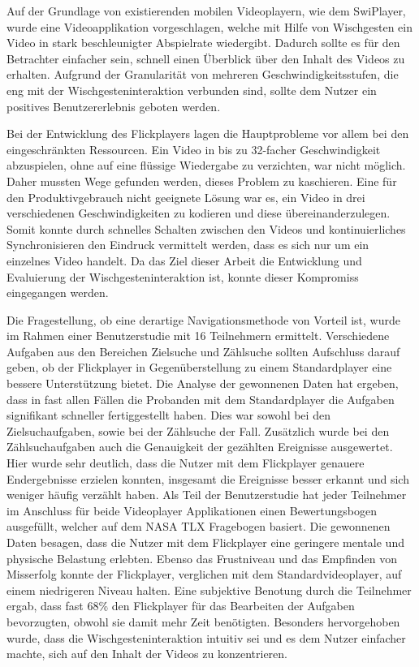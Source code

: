 \documentclass[11pt,a4paper]{report}
\begin{document}
Auf der Grundlage von existierenden mobilen Videoplayern, wie dem SwiPlayer, wurde eine Videoapplikation vorgeschlagen, welche mit Hilfe von Wischgesten ein Video in stark beschleunigter Abspielrate wiedergibt. Dadurch sollte es für den Betrachter einfacher sein, schnell einen Überblick über den Inhalt des Videos zu erhalten. Aufgrund der Granularität von mehreren Geschwindigkeitsstufen, die eng mit der Wischgesteninteraktion verbunden sind, sollte dem Nutzer ein positives Benutzererlebnis geboten werden. 

Bei der Entwicklung des Flickplayers lagen die Hauptprobleme vor allem bei den eingeschränkten Ressourcen. Ein Video in bis zu 32-facher Geschwindigkeit abzuspielen, ohne auf eine flüssige Wiedergabe zu verzichten, war nicht möglich. Daher mussten Wege gefunden werden, dieses Problem zu kaschieren. Eine für den Produktivgebrauch nicht geeignete Lösung war es, ein Video in drei verschiedenen Geschwindigkeiten zu kodieren und diese übereinanderzulegen. Somit konnte durch schnelles Schalten zwischen den Videos und kontinuierliches Synchronisieren den Eindruck vermittelt werden, dass es sich nur um ein einzelnes Video handelt. Da das Ziel dieser Arbeit die Entwicklung und Evaluierung der Wischgesteninteraktion ist, konnte dieser Kompromiss eingegangen werden.

Die Fragestellung, ob eine derartige Navigationsmethode von Vorteil ist, wurde im Rahmen einer Benutzerstudie mit 16 Teilnehmern ermittelt. Verschiedene Aufgaben aus den Bereichen Zielsuche und Zählsuche sollten Aufschluss darauf geben, ob der Flickplayer in Gegenüberstellung zu einem Standardplayer eine bessere Unterstützung bietet. Die Analyse der gewonnenen Daten hat ergeben, dass in fast allen Fällen die Probanden mit dem Standardplayer die Aufgaben signifikant schneller fertiggestellt haben. Dies war sowohl bei den Zielsuchaufgaben, sowie bei der Zählsuche der Fall. Zusätzlich wurde bei den Zählsuchaufgaben auch die Genauigkeit der gezählten Ereignisse ausgewertet. Hier wurde sehr deutlich, dass die Nutzer mit dem Flickplayer genauere Endergebnisse erzielen konnten, insgesamt die Ereignisse besser erkannt und sich weniger häufig verzählt haben. Als Teil der Benutzerstudie hat jeder Teilnehmer im Anschluss für beide Videoplayer Applikationen einen Bewertungsbogen ausgefüllt, welcher auf dem NASA TLX Fragebogen basiert. Die gewonnenen Daten besagen, dass die Nutzer mit dem Flickplayer eine geringere mentale und physische Belastung erlebten. Ebenso das Frustniveau und das Empfinden von Misserfolg konnte der Flickplayer, verglichen mit dem Standardvideoplayer, auf einem niedrigeren Niveau halten. Eine subjektive Benotung durch die Teilnehmer ergab, dass fast 68\% den Flickplayer für das Bearbeiten der Aufgaben bevorzugten, obwohl sie damit mehr Zeit benötigten. Besonders hervorgehoben wurde, dass die Wischgesteninteraktion intuitiv sei und es dem Nutzer einfacher machte, sich auf den Inhalt der Videos zu konzentrieren.
\end{document}

